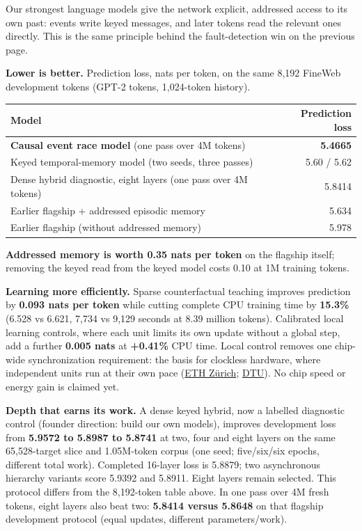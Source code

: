 \documentclass[10pt, a4 paper]{article}
\newcommand{\sect}[2]{\vspace{2pt}{\color{ours}\footnotesize\bfseries\MakeUppercase{#1}}\par\vspace{-3pt}{\LARGE\bfseries #2}\par\vspace{2pt}}
\begin{document}
\newpage
\sect{Language}{Addressed memory leads our language models}

Our strongest language models give the network explicit, addressed access to its own past: events write keyed
messages, and later tokens read the relevant ones directly. This is the same principle behind the fault-detection
win on the previous page.

\begin{tile}
\textbf{Lower is better.} Prediction loss, nats per token, on the same 8,192 FineWeb development tokens (GPT-2 tokens, 1,024-token history).
\begin{center}
\begin{tabular}{lr}
\toprule
Model & Prediction loss \\
\midrule
\textbf{Causal event race model} (one pass over 4M tokens) & \textbf{5.4665} \\
Keyed temporal-memory model (two seeds, three passes) & 5.60 / 5.62 \\
Dense hybrid diagnostic, eight layers (one pass over 4M tokens) & 5.8414 \\
Earlier flagship + addressed episodic memory & 5.634 \\
Earlier flagship (without addressed memory) & 5.978 \\
\bottomrule
\end{tabular}
\end{center}
\textbf{Addressed memory is worth 0.35 nats per token} on the flagship itself; removing the keyed read from the
keyed model costs 0.10 at 1M training tokens.
\end{tile}

\textbf{Learning more efficiently.} Sparse counterfactual teaching improves prediction by \textbf{0.093 nats per
token} while cutting complete CPU training time by \textbf{15.3\%} (6.528 vs 6.621, 7,734 vs 9,129 seconds at 8.39
million tokens). Calibrated local learning controls, where each unit limits its own update without a global step,
add a further \textbf{0.005 nats} at \textbf{+0.41\%} CPU time. Local control removes one chip-wide synchronization
requirement: the basis for clockless hardware, where independent units run at their own pace
(\href{https://iis-people.ee.ethz.ch/~kgf/acacia/acacia.html}{ETH Z\"urich};
\href{https://www.imm.dtu.dk/courses/02204/}{DTU}). No chip speed or energy gain is claimed yet.

\textbf{Depth that earns its work.} A dense keyed hybrid, now a labelled diagnostic control (founder direction: build our own models), improves development loss from
\textbf{5.9572 to 5.8987 to 5.8741} at two, four and eight layers on the same 65,528-target slice and
1.05M-token corpus (one seed; five/six/six epochs, different total work). Completed 16-layer loss is
5.8879; two asynchronous hierarchy variants score 5.9392 and 5.8911. Eight layers remain selected.
This protocol differs from the 8,192-token table above. In one pass over 4M fresh tokens, eight layers also beat two: \textbf{5.8414 versus 5.8648} on that flagship development protocol (equal updates, different parameters/work).
\end{document}
